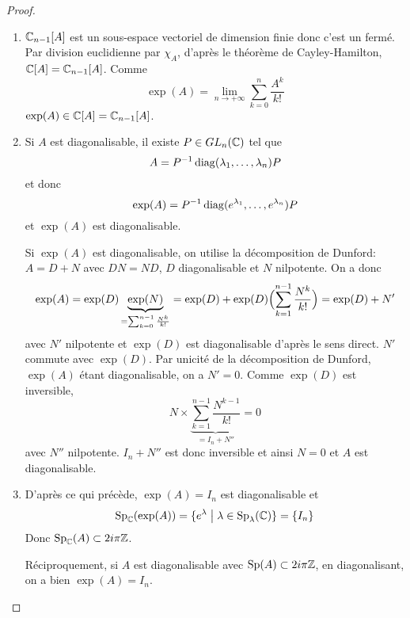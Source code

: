 \begin{proof}
	\phantom{}
	\begin{enumerate}
		\item $\mathbb{C}_{n-1}[A]$ est un sous-espace vectoriel de dimension finie donc c'est un fermé. Par division euclidienne par $\chi_{A}$, d'après le théorème de Cayley-Hamilton, $\mathbb{C}[A]=\mathbb{C}_{n-1}[A]$. Comme 
		\begin{equation}\exp(A)=\lim\limits_{n\to+\infty}\sum_{k=0}^{n}\frac{A^{k}}{k!}\end{equation}
		$\exp(A)\in \mathbb{C}[A]=\mathbb{C}_{n-1}[A]$.

		\item Si $A$ est diagonalisable, il existe $P\in GL_{n}(\mathbb{C})$ tel que 
		\begin{equation}A=P^{-1}\operatorname{diag}(\lambda_{1},\dots,\lambda_{n})P\end{equation}
		et donc 
		\begin{equation}\exp(A)=P^{-1}\operatorname{diag}(e^{\lambda_{1}},\dots,e^{\lambda_{n}})P\end{equation}
		et $\exp(A)$ est diagonalisable.

		Si $\exp(A)$ est diagonalisable, on utilise la décomposition de Dunford: $A=D+N$ avec $DN=ND$, $D$ diagonalisable et $N$ nilpotente. On a donc 
		\begin{equation}\exp(A)=\exp(D)\underbrace{\exp(N)}_{=\sum_{k=0}^{n-1}\frac{N^{k}}{k!}}=\exp(D)+\exp(D)\Bigl(\sum_{k=1}^{n-1}\frac{N^{k}}{k!}\Bigr)=\exp(D)+N'\end{equation}
		avec $N'$ nilpotente et $\exp(D)$ est diagonalisable d'après le sens direct. $N'$ commute avec $\exp(D)$. Par unicité de la décomposition de Dunford, $\exp(A)$ étant diagonalisable, on a $N'=0$. Comme $\exp(D)$ est inversible, 
		\begin{equation}N\times\underbrace{\sum_{k=1}^{n-1}\frac{N^{k-1}}{k!}}_{=I_{n}+N''}=0\end{equation}
		avec $N''$ nilpotente. $I_{n}+N''$ est donc inversible et ainsi $N=0$ et $A$ est diagonalisable.

		\item D'après ce qui précède, $\exp(A)=I_{n}$ est diagonalisable et 
		\begin{equation}\operatorname{Sp}_{\mathbb{C}}(\exp(A))=\{e^{\lambda}\bigm|\lambda\in\operatorname{Sp}_{\lambda}(\mathbb{C})\}=\{I_{n}\}\end{equation}
		Donc $\operatorname{Sp}_{\mathbb{C}}(A)\subset 2i\pi\mathbb{Z}$.

		Réciproquement, si $A$ est diagonalisable avec $\operatorname{Sp}(A)\subset 2i\pi\mathbb{Z}$, en diagonalisant, on a bien $\exp(A)=I_{n}$.


\end{enumerate}
\end{proof}
